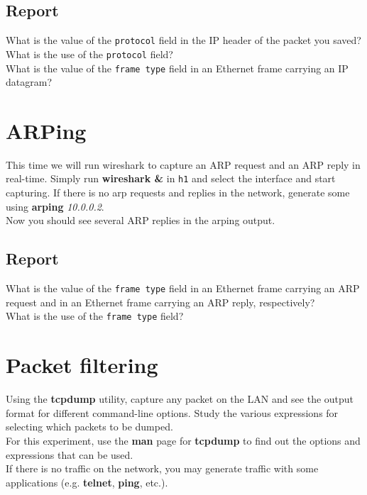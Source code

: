 \documentclass[10pt,a4paper]{article}
\numberwithin{equation}{section}
\numberwithin{figure}{section}
\numberwithin{table}{section}
\begin{document}
    \subsection*{Report}
    What is the value of the \texttt{protocol} field in the IP header of the packet you saved?
    What is the use of the \texttt{protocol} field? \\
    What is the value of the \texttt{frame type} field in an Ethernet frame carrying an IP datagram?


    \section{ARPing}
    This time we will run wireshark to capture an ARP request and an ARP reply in real-time. Simply run \textbf{wireshark \&} in \texttt{h1} and select the interface and start capturing.
    If there is no arp requests and replies in the network, generate some using \textbf{arping} \textit{10.0.0.2}. \\
    Now you should see several ARP replies in the arping output.
    \subsection*{Report}
    What is the value of the \texttt{frame type} field in an Ethernet frame carrying an ARP request and in an Ethernet frame carrying an ARP reply, respectively? \\
    What is the use of the \texttt{frame type} field? \\

    \section{Packet filtering}
    Using the \textbf{tcpdump} utility, capture any packet on the LAN and see the output format
for different command-line options. Study the various expressions for selecting
which packets to be dumped.\\
For this experiment, use the \textbf{man} page for \textbf{tcpdump} to find out the options and
expressions that can be used.\\
If there is no traffic on the network, you may generate traffic with some applications
(e.g. \textbf{telnet}, \textbf{ping}, etc.).\\
\end{document}
